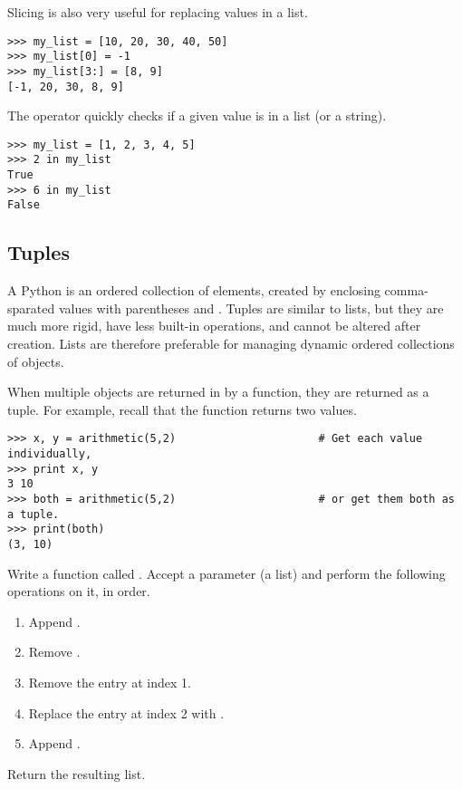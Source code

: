 Slicing is also very useful for replacing values in a list.
\begin{lstlisting}
>>> my_list = [10, 20, 30, 40, 50]
>>> my_list[0] = -1
>>> my_list[3:] = [8, 9]
[-1, 20, 30, 8, 9]
\end{lstlisting}

The  operator quickly checks if a given value is in a list (or a string).
\begin{lstlisting}
>>> my_list = [1, 2, 3, 4, 5]
>>> 2 in my_list
True
>>> 6 in my_list
False
\end{lstlisting}

\subsection*{Tuples} %

A Python  is an ordered collection of elements, created by enclosing comma-sparated values with parentheses \li{(} and \li{)}.
Tuples are similar to lists, but they are much more rigid, have less built-in operations, and cannot be altered after creation.
Lists are therefore preferable for managing dynamic ordered collections of objects.

When multiple objects are returned in by a function, they are returned as a tuple.
For example, recall that the  function returns two values.

\begin{lstlisting}
>>> x, y = arithmetic(5,2)                      # Get each value individually,
>>> print x, y
3 10
>>> both = arithmetic(5,2)                      # or get them both as a tuple.
>>> print(both)
(3, 10)
\end{lstlisting}

\begin{problem} %
Write a function called .
Accept a parameter (a list) and perform the following operations on it, in order.
\begin{enumerate}
\item Append .
\item Remove .
\item Remove the entry at index 1.
\item Replace the entry at index 2 with .
\item Append .
\end{enumerate}
Return the resulting list.
\end{problem}

